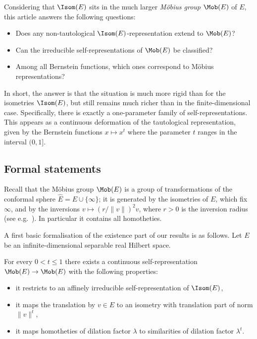 Considering that $\Isom(E)$ sits in the much larger \emph{M\"obius group} $\Mob(E)$ of $E$, this article answers the following questions:

\begin{itemize}
\item Does any non-tautological $\Isom(E)$-representation extend to $\Mob(E)$?
\item Can the irreducible self-representations of $\Mob(E)$ be classified?
\item Among all Bernstein functions, which ones correspond to M\"obius representations?
\end{itemize}

In short, the answer is that the situation is much more rigid than for the isometries $\Isom(E)$, but still remains much richer than in the finite-dimensional case. Specifically, there is exactly a one-parameter family of self-representations. This appears as a continuous deformation of the tautological representation, given by the Bernstein functions $x\mapsto x^t$ where the parameter $t$ ranges in the interval $(0, 1]$.

\subsection{Formal statements}

Recall that the M\"obius group $\Mob(E)$ is a group of transformations of the conform\-al sphere $\widehat E = E\cup\{\infty\}$; it is generated by the isometries of $E$, which fix $\infty$, and by the inversions $v \mapsto (r/\|v\|)^2 v$, where $r>0$ is the inversion radius (see e.g.~\cite[I.3]{Reshetnyak}). In particular it contains all homotheties.

A first basic formalisation of the existence part of our results is as follows. Let $E$ be an infinite-dimensional separable real Hilbert space.

\begin{imain}\label{thm:Mobnew}
For every $0<t\leq 1$ there exists a continuous self-representation $\Mob(E)\to \Mob(E)$ with the following properties:
\begin{itemize}
\item it restricts to an affinely irreducible self-representation of $\Isom(E)$,
\item it maps the translation by $v\in E$ to an isometry with translation part of norm $\|v\|^t$,
\item it maps homotheties of dilation factor $\lambda$ to similarities of dilation factor $\lambda^t$.
\end{itemize}
\end{imain}

